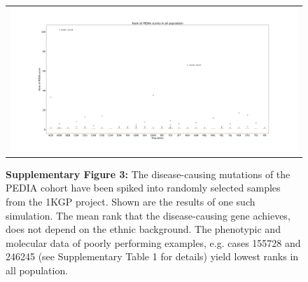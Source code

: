 \documentclass[11pt]{article}
\begin{document}
\begin{figure}[ht]
  \begin{center}
    \graphicspath{{./figures/}}
    \begin{tabular}{c}
      \includegraphics[width=18 cm, height= 9 cm]{population_rank.png}
    \end{tabular}
  \caption*{\textbf{Supplementary Figure 3:} The disease-causing
mutations of the PEDIA cohort have been spiked into randomly selected
samples from the 1KGP project. Shown are the results of one such
simulation. The mean rank that the disease-causing gene achieves, does
not depend on the ethnic background. The phenotypic and molecular data
of poorly performing examples, e.g. cases 155728 and 246245 (see
Supplementary Table 1 for details) yield lowest ranks in all population.}
  \end{center}
\end{figure}

\clearpage
\footnotesize

\end{document}
